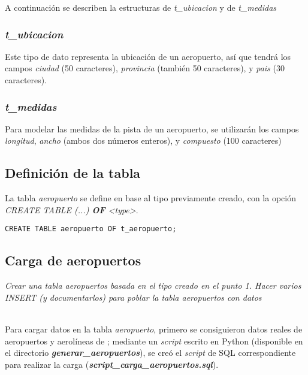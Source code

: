 A continuación se describen la estructuras de \emph{t\_ubicacion} y de \emph{t\_medidas}  

\subsubsection{\emph{t\_ubicacion}}

Este tipo de dato representa la ubicación de un aeropuerto, así que tendrá los campos \emph{ciudad} (50 caracteres), \emph{provincia} (también 50 caracteres), y \emph{pais} (30 caracteres). 

\subsubsection{\emph{t\_medidas}}

Para modelar las medidas de la pista de un aeropuerto, se utilizarán los campos \emph{longitud}, \emph{ancho} (ambos dos números enteros), y \emph{compuesto} (100 caracteres)  

\subsection{Definición de la tabla}

La tabla \emph{aeropuerto} se define en base al tipo previamente creado, con la opción \emph{CREATE TABLE (...) \textbf{OF} <type>}. 

\vspace*{5mm}
\lstset{style=sql}
\begin{lstlisting}
CREATE TABLE aeropuerto OF t_aeropuerto;
\end{lstlisting}

\subsection{Carga de aeropuertos}

\emph{Crear una tabla aeropuertos basada en el tipo creado en el punto 1. Hacer varios INSERT (y documentarlos) para poblar la tabla aeropuertos con datos} 

~\\

Para cargar datos en la tabla \emph{aeropuerto}, primero se consiguieron datos reales de aeropuertos y aerolíneas de \autocite{datasets}; mediante un \emph{script} escrito en Python (disponible en el directorio \textbf{\emph{generar\_aeropuertos}}), se creó el \emph{script} de SQL correspondiente para realizar la carga (\textbf{\emph{script\_carga\_aeropuertos.sql}}).

